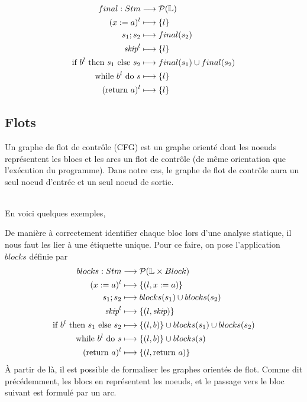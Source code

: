 \documentclass[a4paper, 10pt]{article}
\begin{document}
\begin{align*}
	final : Stm &\longrightarrow \mathcal{P}(\mathbb{L})\\
	({x}\space:=\space{a})^l &\longmapsto \{l\}\\
	{s_1}\space;\space{s_2} &\longmapsto final(s_2)\\
	\textit{skip}^l &\longmapsto \{l\}\\
	\text{if }{b^l}\text{ then }{s_1}\text{ else }{s_2} &\longmapsto final(s_1) \cup final(s_2)\\
	\text{while }{b^l}\text{ do }{s} &\longmapsto \{l\}\\
	(\text{return }{a})^l &\longmapsto \{l\}
\end{align*}

\subsection{Flots}
\begin{definition}
	Un graphe de flot de contrôle (CFG) est un graphe orienté dont les noeuds représentent les blocs et les arcs un
	flot de contrôle (de même orientation que l'exécution du programme). Dans notre cas, le graphe de flot de
	contrôle aura un seul noeud d'entrée et un seul noeud de sortie.
\end{definition}
\\
En voici quelques exemples,
\begin{center}\end{center}

De manière à correctement identifier chaque bloc lors d'une analyse statique, il nous faut les lier à une étiquette
unique. Pour ce faire, 
on pose l'application $blocks$ définie par
\begin{align*}
	blocks : Stm &\longrightarrow \mathcal{P}(\mathbb{L} \times Block)\\
	({x}\space:=\space{a})^l&\longmapsto\{(l, x := a)\}\\
	{s_1}\space;\space{s_2} &\longmapsto blocks(s_1) \cup blocks(s_2)\\
	\textit{skip}^l &\longmapsto \{(l, \textit{skip})\}\\
	\text{if }{b^l}\text{ then }{s_1}\text{ else }{s_2} &\longmapsto \{(l, b)\}\cup blocks(s_1)\cup blocks(s_2)\\
	\text{while }{b^l}\text{ do }{s} &\longmapsto \{(l, b)\}\cup blocks(s)\\
	(\text{return }{a})^l &\longmapsto \{(l, \text{return }{a})\}
\end{align*}
À partir de là, il est possible de formaliser les graphes orientés de flot. Comme dit précédemment, les blocs en représentent les noeuds, 
et le passage vers le bloc suivant est formulé par un arc.
\end{document}
